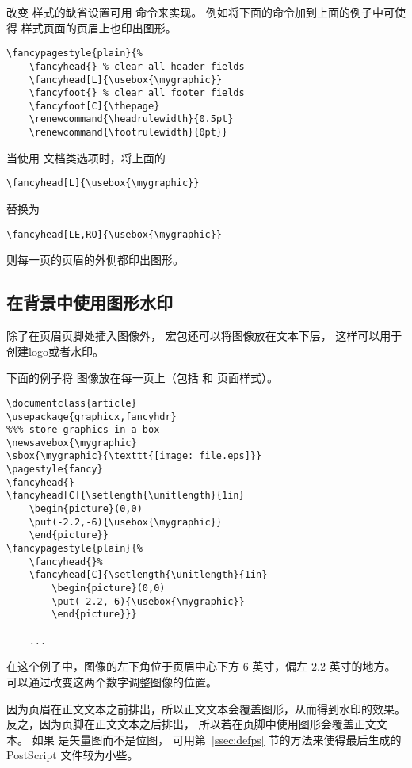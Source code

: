 改变  样式的缺省设置可用  命令来实现。
例如将下面的命令加到上面的例子中可使得  样式页面的页眉上也印出图形。

\begin{lstlisting}
\fancypagestyle{plain}{%
	\fancyhead{} % clear all header fields
	\fancyhead[L]{\usebox{\mygraphic}}
	\fancyfoot{} % clear all footer fields
	\fancyfoot[C]{\thepage}
	\renewcommand{\headrulewidth}{0.5pt}
	\renewcommand{\footrulewidth}{0pt}}
\end{lstlisting}

当使用 \opt{[twoside]} 文档类选项时，将上面的
\begin{lstlisting}
\fancyhead[L]{\usebox{\mygraphic}}
\end{lstlisting}
替换为
\begin{lstlisting}
\fancyhead[LE,RO]{\usebox{\mygraphic}}
\end{lstlisting}
则每一页的页眉的外侧都印出图形。


\subsection{在背景中使用图形水印}\label{ssec:watermark}

除了在页眉页脚处插入图像外， 宏包还可以将图像放在文本下层，
这样可以用于创建logo或者水印。

下面的例子将  图像放在每一页上（包括  和  页面样式）。
\begin{lstlisting}
\documentclass{article}
\usepackage{graphicx,fancyhdr}
%%% store graphics in a box
\newsavebox{\mygraphic}
\sbox{\mygraphic}{\texttt{[image: file.eps]}}
\pagestyle{fancy}
\fancyhead{}
\fancyhead[C]{\setlength{\unitlength}{1in}
	\begin{picture}(0,0)
	\put(-2.2,-6){\usebox{\mygraphic}}
	\end{picture}}
\fancypagestyle{plain}{%
	\fancyhead{}%
	\fancyhead[C]{\setlength{\unitlength}{1in}
		\begin{picture}(0,0)
		\put(-2.2,-6){\usebox{\mygraphic}}
		\end{picture}}}

	...

\end{lstlisting}
在这个例子中，图像的左下角位于页眉中心下方 6 英寸，偏左 $2.2$ 英寸的地方。
可以通过改变这两个数字调整图像的位置。

因为页眉在正文文本之前排出，所以正文文本会覆盖图形，从而得到水印的效果。
反之，因为页脚在正文文本之后排出，
所以若在页脚中使用图形会覆盖正文文本。
如果  是矢量图而不是位图，
可用第~\ref{ssec:defps} 节的方法来使得最后生成的 PostScript 文件较为小些。

